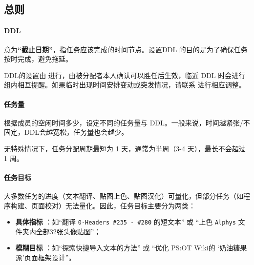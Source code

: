 \documentclass[UTF8, a4paper, 12pt]{ctexart}
\begin{document}
\newcommand{\newtask}[6]{
    \subsubsection{#1}
    \begin{itemize}
        \item \textbf{任务}\  #2
        \item \textbf{DDL}\  #3
        \item \textbf{备注}\  #4
        \item \textbf{已确认？}\  #5
        \item \textbf{已完成？}\  #6
    \end{itemize}
}
\subsection{总则}
\paragraph{DDL} 意为\textbf{“截止日期”}，指任务应该完成的时间节点。设置DDL 的目的是为了确保任务按时完成，避免拖延。

DDL的设置由  进行，由被分配者本人确认可以胜任后生效，临近 DDL 时会进行组内相互提醒。如果临时出现时间安排变动或突发情况，请联系  进行相应调整。

\paragraph{任务量} 根据成员的空闲时间多少，设定不同的任务量与 DDL。一般来说，时间越紧张/不固定，DDL会越宽松，任务量也会越少。

无特殊情况下，任务分配周期最短为 1 天，通常为半周（3-4 天），最长不会超过 1 周。

\paragraph{任务目标} 大多数任务的进度（文本翻译、贴图上色、贴图汉化）可量化，但部分任务（如程序构建、页面校对）无法量化。因此，任务目标主要分为两类：
\begin{itemize}
    \item \textbf{具体指标} ：如“翻译 \verb|0-Headers #235 - #280| 的短文本” 或 “上色 \verb|Alphys| 文件夹内全部32张头像贴图”；
    \item \textbf{模糊目标} ：如“探索快捷导入文本的方法” 或 “优化 PS:OT Wiki的 ‘奶油糖果派’页面框架设计”。
\end{itemize}
\end{document}
